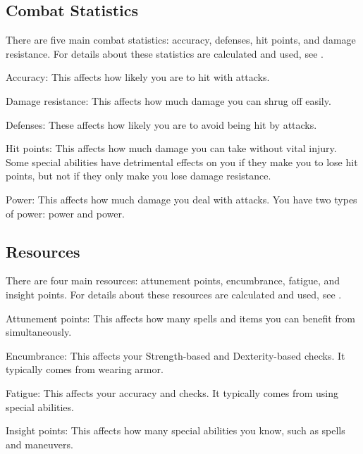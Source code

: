     \subsection{Combat Statistics}
        There are five main combat statistics: accuracy, defenses, hit points, and damage resistance.
        For details about these statistics are calculated and used, see .
        \begin{raggeditemize}
            \item Accuracy: This affects how likely you are to hit with attacks.
            \item Damage resistance: This affects how much damage you can shrug off easily.
            \item Defenses: These affects how likely you are to avoid being hit by attacks.
            \item Hit points: This affects how much damage you can take without vital injury.
                Some special abilities have detrimental effects on you if they make you to lose hit points, but not if they only make you lose damage resistance.
            \item Power: This affects how much damage you deal with attacks.
                You have two types of power: \magical power and  power.
        \end{raggeditemize}

    \subsection{Resources}
        There are four main resources: attunement points, encumbrance, fatigue, and insight points.
        For details about these resources are calculated and used, see .
        \begin{raggeditemize}
            \item Attunement points: This affects how many spells and items you can benefit from simultaneously.
            \item Encumbrance: This affects your Strength-based and Dexterity-based checks.
                It typically comes from wearing armor.
            \item Fatigue: This affects your accuracy and checks.
                It typically comes from using special abilities.
            \item Insight points: This affects how many special abilities you know, such as spells and maneuvers.
        \end{raggeditemize}

